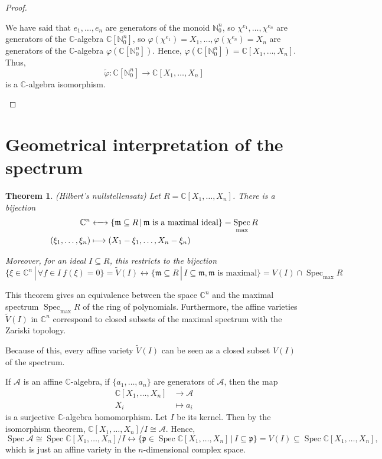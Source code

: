 \documentclass[12pt]{article}
\newtheorem*{theorem}{Theorem}
\theoremstyle{definition}
\DeclareMathOperator{\Spec}{Spec}
\begin{document}
\begin{proof}
\begin{enumerate}[label=\arabic*)]
We have said that $e_1,\ldots,e_n$ are generators of the monoid $\mathbb{N}_0^n$, so $\chi^{e_1},\ldots,\chi^{e_n}$ are generators of the $\mathbb{C}$-algebra $\mathbb{C}[\mathbb{N}_0^n]$, so $\varphi(\chi^{e_1})=X_1,\ldots,\varphi(\chi^{e_n})=X_n$ are generators of the $\mathbb{C}$-algebra $\varphi(\mathbb{C}[\mathbb{N}_0^n])$. Hence, $\varphi(\mathbb{C}[\mathbb{N}_0^n])=\mathbb{C}[X_1,\ldots,X_n]$. Thus,
\[\tilde{\varphi}:\mathbb{C}[\mathbb{N}_0^n]\rightarrow\mathbb{C}[X_1,\ldots,X_n]\]
is a $\mathbb{C}$-algebra isomorphism.
\end{enumerate}
\end{proof}

\section{Geometrical interpretation of the spectrum}
\begin{theorem}
(Hilbert's nullstellensatz) Let $R=\mathbb{C}[X_1,\ldots,X_n]$. There is a bijection
\begin{align*}
\mathbb{C}^n&\xleftrightarrow{\hspace{4.4mm}}\{\mathfrak{m}\subseteq R\,|\,\mathfrak{m}\text{ is a maximal ideal}\}=\Spec_{\text{max}}R\\
(\xi_1,\ldots,\xi_n)&\longmapsto(X_1-\xi_1,\ldots,X_n-\xi_n)
\end{align*}

Moreover, for an ideal $I\subseteq R$, this restricts to the bijection
\[\{\xi\in\mathbb{C}^n\,|\,\forall f\in I\ f(\xi)=0\}=\widetilde{V}(I)\longleftrightarrow\{\mathfrak{m}\subseteq R\,|\,I\subseteq\mathfrak{m},\mathfrak{m}\text{ is maximal}\}=V(I)\cap\Spec_{\text{max}}R\]
\end{theorem}

This theorem gives an equivalence between the space $\mathbb{C}^n$ and the maximal spectrum $\Spec_{\text{max}}R$ of the ring of polynomials. Furthermore, the affine varieties $\widetilde{V}(I)$ in $\mathbb{C}^n$ correspond to closed subsets of the maximal spectrum with the Zariski topology.

Because of this, every affine variety $\widetilde{V}(I)$ can be seen as a closed subset $V(I)$ of the spectrum.

If $\mathcal{A}$ is an affine $\mathbb{C}$-algebra, if $\{a_1,\ldots,a_n\}$ are generators of $\mathcal{A}$, then the map
\begin{align*}
\mathbb{C}[X_1,\ldots,X_n]&\longrightarrow\mathcal{A}\\
X_i&\longmapsto a_i
\end{align*}
is a surjective $\mathbb{C}$-algebra homomorphism. Let $I$ be its kernel. Then by the isomorphism theorem, $\mathbb{C}[X_1,\ldots,X_n]/I\cong\mathcal{A}$. Hence,
\[\Spec\mathcal{A}\cong\Spec\mathbb{C}[X_1,\ldots,X_n]/I\longleftrightarrow\{\mathfrak{p}\in\Spec\mathbb{C}[X_1,\ldots,X_n]\,|\,I\subseteq\mathfrak{p}\}=V(I)\subseteq\Spec\mathbb{C}[X_1,\ldots,X_n],\]
which is just an affine variety in the $n$-dimensional complex space.
\end{document}
